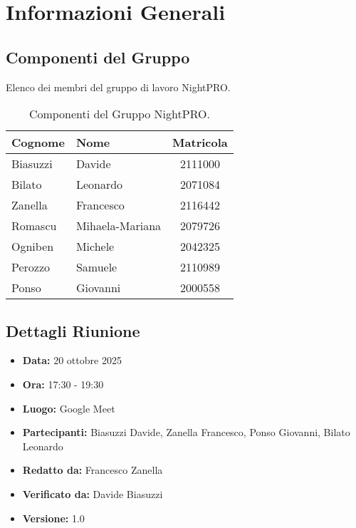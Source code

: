 \documentclass[a4paper, 11pt, oneside]{scrartcl} %
\begin{document}
\section{Informazioni Generali}

\subsection{Componenti del Gruppo}
Elenco dei membri del gruppo di lavoro NightPRO.

\begin{table}[h!]
\centering
\begin{tabular}{@{}llc@{}}
\toprule
\textbf{Cognome} & \textbf{Nome} & \textbf{Matricola} \\
\midrule
Biasuzzi & Davide & 2111000 \\
Bilato & Leonardo & 2071084 \\
Zanella & Francesco & 2116442 \\
Romascu & Mihaela-Mariana & 2079726 \\
Ogniben & Michele & 2042325 \\
Perozzo & Samuele & 2110989 \\
Ponso & Giovanni & 2000558 \\
\bottomrule
\end{tabular}
\caption{Componenti del Gruppo NightPRO.}
\end{table}

\subsection{Dettagli Riunione}
\begin{itemize}
    \item \textbf{Data:} 20 ottobre 2025
    \item \textbf{Ora:} 17:30 - 19:30
    \item \textbf{Luogo:} Google Meet
    \item \textbf{Partecipanti:} Biasuzzi Davide, Zanella Francesco, Ponso Giovanni, Bilato Leonardo
    \item  \textbf{Redatto da: } Francesco Zanella
    \item  \textbf{Verificato da:} Davide Biasuzzi
    \item \textbf{Versione: } 1.0
\end{itemize}


\newpage
\end{document}
